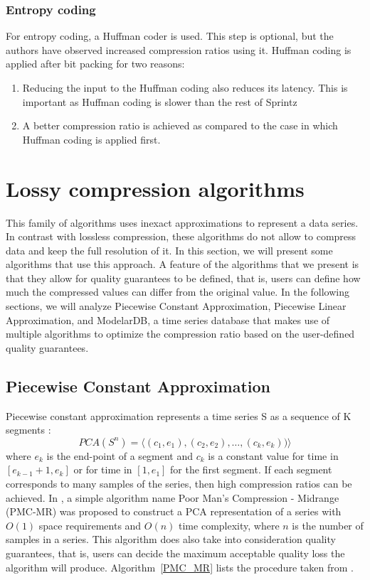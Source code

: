 \subsubsection{Entropy coding}
For entropy coding, a Huffman coder is used. This step is optional, but the authors have
observed increased compression ratios using it. Huffman coding is applied after bit packing
for two reasons:
\begin{enumerate}
    \item Reducing the input to the Huffman coding also reduces its latency. This is
    important as Huffman coding is slower than the rest of Sprintz
    \item A better compression ratio is achieved as compared to the case in which Huffman
    coding is applied first.
\end{enumerate}

\section{Lossy compression algorithms}
This family of algorithms uses inexact approximations to represent a data series. In
contrast with lossless compression, these algorithms do not allow to compress data and
keep the full resolution of it. In this section, we will present some algorithms that use
this approach. A feature of the algorithms that we present is that they allow for quality
guarantees to be defined, that is, users can define how much the compressed values can differ
from the original value. In the following sections, we will analyze Piecewise Constant
Approximation, Piecewise Linear Approximation, and ModelarDB, a time series database that
makes use of multiple algorithms to optimize the compression ratio based on the user-defined
quality guarantees.

\subsection{Piecewise Constant Approximation}
Piecewise constant approximation represents a time series S as a sequence of K segments
\cite{keogh2001locally}\cite{lazaridis2003capturing}:
$$PCA(S^n) = \langle(c_1, e_1), (c_2, e_2), \ldots, (c_k, e_k))\rangle$$
where $e_k$  is the end-point of a segment and $c_k$ is a constant value for time in
$[e_{k-1} + 1, e_k]$ or for time in $[1, e_1]$ for the first segment. If each segment
corresponds to many samples of the series, then high compression ratios can be achieved.
In \cite{lazaridis2003capturing}, a simple algorithm name Poor Man’s Compression -
Midrange (PMC-MR) was proposed to construct a PCA  representation of a series with
$O(1)$ space requirements and $O(n)$ time complexity, where $n$ is the number of samples
in a series. This algorithm does also take into consideration quality guarantees, that
is, users can decide the maximum acceptable quality loss the algorithm will produce.
Algorithm~\ref{PMC_MR} lists the procedure taken from \cite{lazaridis2003capturing}.


